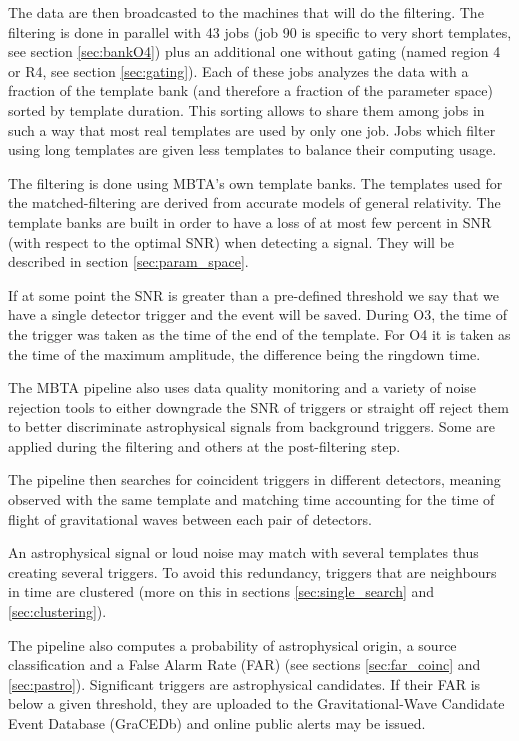 The data are then broadcasted to the machines that will do the filtering.
The filtering is done in parallel with 43 jobs (job 90 is specific to very short templates, see section \ref{sec:bankO4}) plus an additional one without gating (named region 4 or R4, see section \ref{sec:gating}).
Each of these jobs analyzes the data with a fraction of the template bank (and therefore a fraction of the parameter space) sorted by template duration.
This sorting allows to share them among jobs in such a way that most real templates are used by only one job.
Jobs which filter using long templates are given less templates to balance their computing usage.

The filtering is done using MBTA's own template banks.
The templates used for the matched-filtering are derived from accurate models of general relativity.
The template banks are built in order to have a loss of at most few percent in SNR (with respect to the optimal SNR) when detecting a signal.
They will be described in section \ref{sec:param_space}.

If at some point the SNR is greater than a pre-defined threshold we say that we have a single detector trigger and the event will be saved.
During O3, the time of the trigger was taken as the time of the end of the template.
For O4 it is taken as the time of the maximum amplitude, the difference being the ringdown time.

The MBTA pipeline also uses data quality monitoring and a variety of noise rejection tools to either downgrade the SNR of triggers or straight off reject them to better discriminate astrophysical signals from background triggers.
Some are applied during the filtering and others at the post-filtering step.

The pipeline then searches for coincident triggers in different detectors, meaning observed with the same template and matching time accounting for the time of flight of gravitational waves between each pair of detectors.

An astrophysical signal or loud noise may match with several templates thus creating several triggers.
To avoid this redundancy, triggers that are neighbours in time are clustered (more on this in sections \ref{sec:single_search} and \ref{sec:clustering}).

The pipeline also computes a probability of astrophysical origin, a source classification and a False Alarm Rate (FAR) (see sections \ref{sec:far_coinc} and \ref{sec:pastro}).
Significant triggers are astrophysical candidates.
If their FAR is below a given threshold, they are uploaded to the Gravitational-Wave Candidate Event Database (GraCEDb) and online public alerts may be issued.


